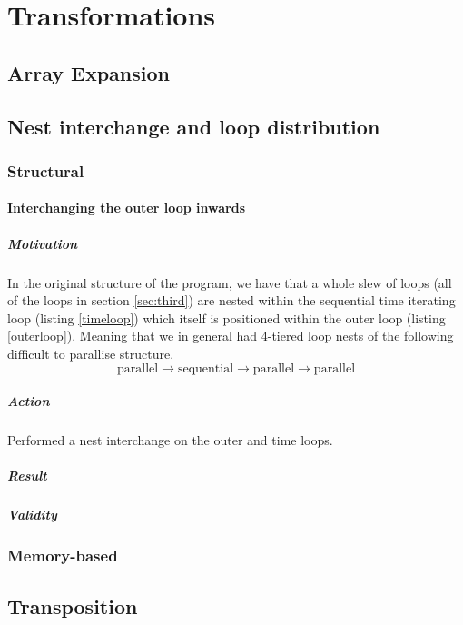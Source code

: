 \section{Transformations}

\subsection{Array Expansion}

\subsection{Nest interchange and loop distribution}

\subsubsection{Structural}
\paragraph{Interchanging the outer loop inwards}
\subparagraph{Motivation} In the original structure of the program, we have that a whole slew of loops
 (all of the loops in section \ref{sec:third}) are nested
 within the sequential time iterating loop (listing \ref{timeloop}) which itself is positioned within
 the outer loop (listing \ref{outerloop}). Meaning that we in general had 4-tiered loop nests of the following difficult to parallise
 structure.
$$\mathrm{parallel} \to \mathrm{sequential} \to \mathrm{parallel} \to \mathrm{parallel}$$

\subparagraph{Action} Performed a nest interchange on the outer and time loops.

\subparagraph{Result}

\subparagraph{Validity}


\subsubsection{Memory-based}


\subsection{Transposition}

